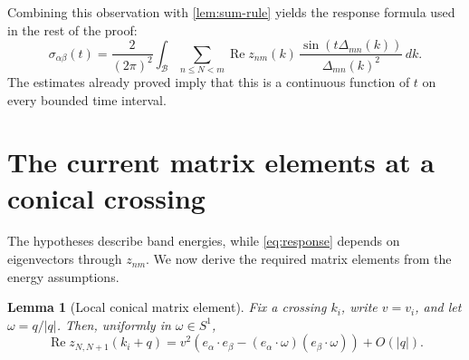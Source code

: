 \documentclass[11pt,a4paper]{article}
\newcommand{\B}{\mathcal B}
\DeclareMathOperator{\Ree}{Re}
\newtheorem{lemma}[lemma]{Lemma}
\numberwithin{equation}{section}
\begin{document}
Combining this observation with \cref{lem:sum-rule} yields the response
formula used in the rest of the proof:
\begin{equation}\label{eq:response}
 \boxed{\displaystyle
 \sigma_{\alpha\beta}(t)
 =\frac{2}{(2\pi)^2}\int_\B\sum_{n\leq N<m}
 \Ree z_{nm}(k)\,
 \frac{\sin(t\Delta_{mn}(k))}{\Delta_{mn}(k)^2}\,dk.}
\end{equation}
The estimates already proved imply that this is a continuous function
of $t$ on every bounded time interval.

\section{The current matrix elements at a conical crossing}
\label{sec:cone}

The hypotheses describe band energies, while \eqref{eq:response}
depends on eigenvectors through $z_{nm}$. We now derive the required
matrix elements from the energy assumptions.

\begin{lemma}[Local conical matrix element]\label{lem:cone}
Fix a crossing $k_i$, write $v=v_i$, and let
$\omega=q/|q|$. Then, uniformly in $\omega\in S^1$,
\begin{equation}\label{eq:cone-matrix}
 \Ree z_{N,N+1}(k_i+q)
 =v^2\left(e_\alpha\cdot e_\beta
 -(e_\alpha\cdot\omega)(e_\beta\cdot\omega)\right)+O(|q|).
\end{equation}
\end{lemma}
\end{document}
